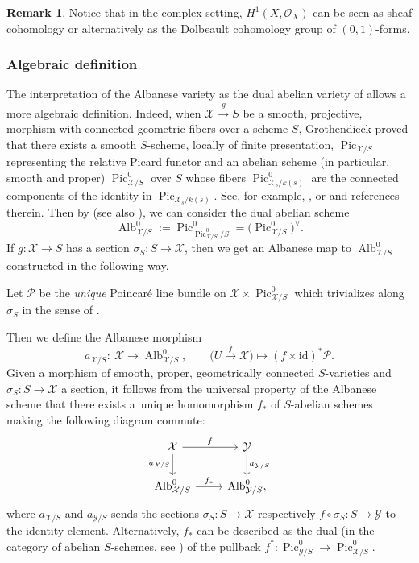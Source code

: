 \documentclass[pdftex]{sigma}
\newcommand{\Pic}{\operatorname{Pic}}
\newcommand{\Alb}{\operatorname{Alb}}
\newcommand{\X}{\mathcal{X}}
\renewcommand{\O}{\mathcal{O}}
\newcommand{\Y}{\mathcal{Y}}
\numberwithin{equation}{section}
\theoremstyle{definition}
\newtheorem{remarkk}[theo]{Remark}
\begin{document}
\begin{remarkk}
 Notice that in the complex setting, $H^1(X,\O_X)$ can be seen as sheaf cohomology or alternatively as the Dolbeault cohomology group of $(0,1)$-forms.
\end{remarkk}



\subsubsection{Algebraic definition}
The interpretation of the Albanese variety as the dual abelian variety of 
allows a more algebraic definition.
 Indeed, when $\X\xrightarrow{g} S$ be a smooth, projective, morphism with connected geometric fibers over a scheme $S$, Grothendieck proved that there exists a smooth $S$-scheme, locally of finite presentation, $\Pic_{\X\slash S}$ representing the relative Picard functor and an abelian scheme (in particular, smooth and proper) $\Pic^0_{\X\slash S}$ over $S$ whose fibers $\Pic^0_{\X_s\slash k(s)}$ are the connected components of the identity in $\Pic_{\X_s\slash k(s)}$. See, for example, \cite[Section~9]{fantechi2006fundamental}, or \cite[Chapter~8]{bosch2012neron} and references therein.
Then by \cite[Theorem~3.3]{grothendieck1961technique} (see also \cite{milneAV,mochizuki2012topics}), we can consider the dual abelian scheme
\[\Alb^0_{\X\slash S}:=\Pic^0_{\Pic^0_{\X/S}\slash S}=\bigl(\Pic^0_{\X\slash S}\bigr)^\vee.\]
If $g\colon \X\to S$ has a section $\sigma_S\colon S\to\X$, then we get an Albanese map to $\Alb^0_{\X\slash S}$ constructed in the following way.

Let $\mathcal P$ be the \emph{unique} Poincar\'e line bundle on $\X\times\Pic^0_{\X\slash S}$ which trivializes along $\sigma_S$ in the sense of \cite[Section~4]{bosch2012neron}.

Then we define the Albanese morphism
\[
 a_{\X\slash S}\colon \ \X \longrightarrow \Alb^0_{\X\slash S},\qquad
 \big(U\xrightarrow{f} \X\big) \longmapsto (f\times\mathrm{id})^*\mathcal P.
 \]
Given \smash{$\X\xrightarrow{f} \Y$} a morphism of smooth, proper, geometrically connected $S$-varieties and $\sigma_S\colon S\allowbreak\to \X$ a section, it follows from the universal property of the Albanese scheme that there exists a~unique homomorphism $f_*$ of $S$-abelian schemes making the following diagram commute:
\[
\begin{tikzcd}
\X\ar[r,"f"]\ar[d,"a_{\X\slash S}"'] & \Y\ar[d,"a_{\Y\slash S}"]\\
\Alb^0_{\X\slash S}\ar[r,"f_*"] & \Alb^0_{\Y\slash S},
\end{tikzcd}
\]
where $a_{\X\slash S}$ and $a_{\Y\slash S}$ sends the sections $\sigma_S\colon S\to \X$ respectively $f\circ \sigma_S \colon S\to \Y$ to the identity element. Alternatively, $f_*$ can be described as the dual (in the category of abelian $S$-schemes, see \cite[Section~I.8]{milneAV}) of the pullback
$f^*\colon \Pic^0_{\Y\slash S}\to \Pic^0_{\X\slash S}$.
\end{document}
